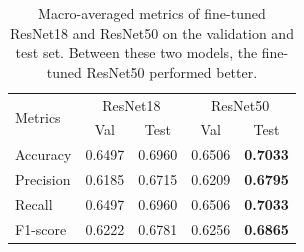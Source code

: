 \begin{table}[h!]
    \begin{tabular}{lcccc}
    \toprule
\multirow{2}{*}{Metrics} & \multicolumn{2}{c}{ResNet18} & \multicolumn{2}{c}{ResNet50} \\ \cmidrule(lr){2-3} \cmidrule(lr){4-5}
                         & Val           & Test          & Val           & Test         \\ \hline
Accuracy                 & 0.6497        & 0.6960        & 0.6506        & \textbf{0.7033}       \\
Precision                & 0.6185        & 0.6715        & 0.6209        & \textbf{0.6795}       \\
Recall                   & 0.6497        & 0.6960        & 0.6506        & \textbf{0.7033}       \\
F1-score                 & 0.6222        & 0.6781        & 0.6256        & \textbf{0.6865}       \\ \bottomrule
    \end{tabular}
    \vspace{\baselineskip}
    \caption{Macro-averaged metrics of fine-tuned ResNet18 and ResNet50 on the validation and test set. Between these two models, the fine-tuned ResNet50 performed better.}
    \label{fig:resnet_compare}
    \vspace{-5mm}
\end{table}

